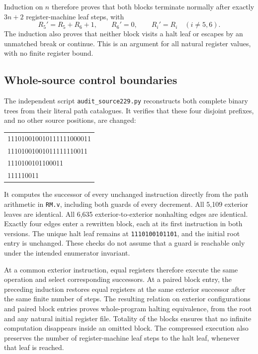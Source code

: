 Induction on $n$ therefore proves that both blocks terminate normally
after exactly $3n+2$ register-machine leaf steps, with
\[
 R_5'=R_5+R_6+1,\qquad R_6'=0,
 \qquad R_i'=R_i\quad(i\ne5,6).
\]
The induction also proves that neither block visits a halt leaf or
escapes by an unmatched break or continue.  This is an argument for
all natural register values, with no finite register bound.

\subsection{Whole-source control boundaries}

The independent script \texttt{audit\_source229.py} reconstructs both
complete binary trees from their literal path catalogues.  It verifies
that these four disjoint prefixes, and no other source positions, are
changed:
\begin{center}\small\ttfamily
\begin{tabular}{l}
111010010010111111000011\\
11101001001011111110011\\
1110100101100011\\
111110011
\end{tabular}
\end{center}
It computes the successor of every unchanged instruction directly
from the path arithmetic in \texttt{RM.v}, including both guards of
every decrement.  All 5,109 exterior leaves are identical.  All 6,635
exterior-to-exterior nonhalting edges are identical.  Exactly four
edges enter a rewritten block, each at its first instruction in
both versions.  The unique halt leaf remains at
\texttt{1110100101101}, and the initial root entry is unchanged.
These checks do not assume that a guard is reachable only under the
intended enumerator invariant.

At a common exterior instruction, equal registers therefore execute
the same operation and select corresponding successors.  At a paired
block entry, the preceding induction restores equal registers at the
same exterior successor after the same finite number of steps.
The resulting relation on exterior configurations and paired block
entries proves whole-program halting equivalence, from the root and
any natural initial register file.  Totality of the blocks ensures
that no infinite computation disappears inside an omitted block.
The compressed execution also preserves the number of register-machine
leaf steps to the halt leaf, whenever that leaf is reached.

